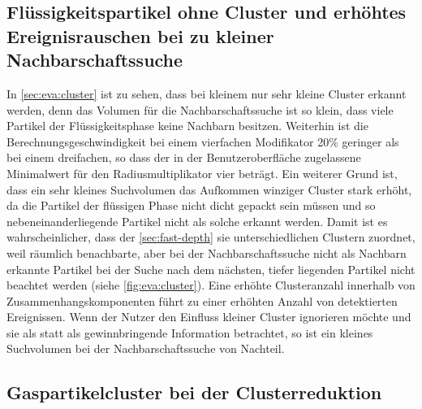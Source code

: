 \subsection*{Flüssigkeitspartikel ohne Cluster und erhöhtes Ereignisrauschen bei zu kleiner Nachbarschaftssuche}
In \autoref{sec:eva:cluster} ist zu sehen, dass bei kleinem  nur sehr kleine Cluster erkannt werden, denn das Volumen für die Nachbarschaftssuche ist so klein, dass viele Partikel der Flüssigkeitsphase keine Nachbarn besitzen. Weiterhin ist die Berechnungsgeschwindigkeit bei einem vierfachen Modifikator 20\% geringer als bei einem dreifachen, so dass der in der Benutzeroberfläche zugelassene Minimalwert für den Radiusmultiplikator vier beträgt. Ein weiterer Grund ist, dass ein sehr kleines Suchvolumen das Aufkommen winziger Cluster stark erhöht, da die Partikel der flüssigen Phase nicht dicht gepackt sein müssen und so nebeneinanderliegende Partikel nicht als solche erkannt werden. 
Damit ist es wahrscheinlicher, dass der \CFD \autoref{sec:fast-depth} sie unterschiedlichen Clustern zuordnet, weil räumlich benachbarte, aber bei der Nachbarschaftssuche nicht als Nachbarn erkannte Partikel bei der Suche nach dem nächsten, tiefer liegenden Partikel nicht beachtet werden (siehe \autoref{fig:eva:cluster}). Eine erhöhte Clusteranzahl innerhalb von Zusammenhangskomponenten führt zu einer erhöhten Anzahl von detektierten Ereignissen. Wenn der Nutzer den Einfluss kleiner Cluster ignorieren möchte und sie als  statt als gewinnbringende Information betrachtet, so ist ein kleines Suchvolumen bei der Nachbarschaftssuche von Nachteil.

\subsection*{Gaspartikelcluster bei der Clusterreduktion}  %

